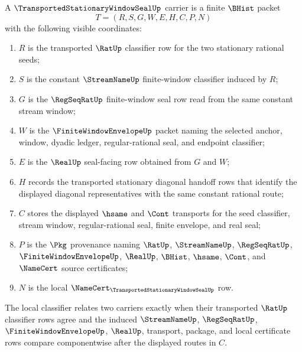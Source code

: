 \begin{definition}
\label{def:transported-stationary-window-seal-carrier}
A $\TransportedStationaryWindowSealUp$ carrier is a finite $\BHist$ packet
$$
T=(R,S,G,W,E,H,C,P,N)
$$
with the following visible coordinates:
\begin{enumerate}
\item $R$ is the transported $\RatUp$ classifier row for the two stationary rational seeds;
\item $S$ is the constant $\StreamNameUp$ finite-window classifier induced by $R$;
\item $G$ is the $\RegSeqRatUp$ finite-window seal row read from the same constant stream window;
\item $W$ is the $\FiniteWindowEnvelopeUp$ packet naming the selected anchor, window, dyadic ledger, regular-rational seal, and endpoint classifier;
\item $E$ is the $\RealUp$ seal-facing row obtained from $G$ and $W$;
\item $H$ records the transported stationary diagonal handoff rows that identify the displayed diagonal representatives with the same constant rational route;
\item $C$ stores the displayed $\hsame$ and $\Cont$ transports for the seed classifier, stream window, regular-rational seal, finite envelope, and real seal;
\item $P$ is the $\Pkg$ provenance naming $\RatUp$, $\StreamNameUp$, $\RegSeqRatUp$, $\FiniteWindowEnvelopeUp$, $\RealUp$, $\BHist$, $\hsame$, $\Cont$, and $\NameCert$ source certificates;
\item $N$ is the local $\NameCert_{\TransportedStationaryWindowSealUp}$ row.
\end{enumerate}
The local classifier relates two carriers exactly when their transported $\RatUp$ classifier rows agree and the induced $\StreamNameUp$, $\RegSeqRatUp$, $\FiniteWindowEnvelopeUp$, $\RealUp$, transport, package, and local certificate rows compare componentwise after the displayed routes in $C$.
\end{definition}

